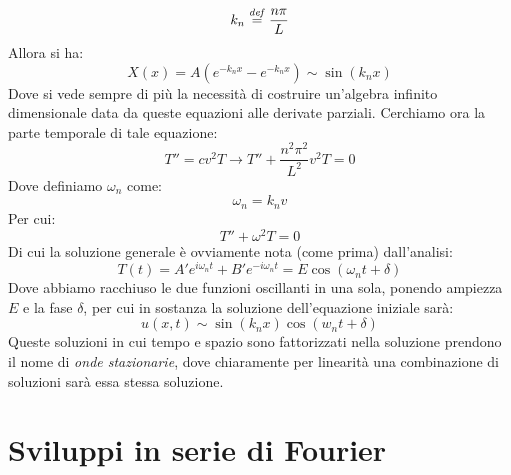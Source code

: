 \begin{equation*}
    k_n \overset{\mathit{def}}{=} \frac{n\pi}{L}
\end{equation*}
Allora si ha:
\begin{equation*}
    X(x) = A ( e^{-k_nx} - e^{-k_nx} ) \sim \sin(k_nx)
\end{equation*}
Dove si vede sempre di più la necessità di costruire un'algebra infinito dimensionale data da queste equazioni alle derivate parziali. Cerchiamo ora la parte temporale di tale equazione:
\begin{equation*}
    T'' = c v^2 T \longrightarrow
    T'' + \frac{n^2\pi^2}{L^2} v^2 T = 0
\end{equation*}
Dove definiamo $\omega_n$ come:
\begin{equation*}
    \omega_n=k_nv
\end{equation*}
Per cui:
\begin{equation*}
    T'' + \omega^2T = 0
\end{equation*}
Di cui la soluzione generale è ovviamente nota (come prima) dall'analisi:
\begin{equation*}
    T(t) = A' e^{i\omega_n t} + B' e^{-i\omega_n t} =
    E \cos(\omega_n t + \delta)
\end{equation*}
Dove abbiamo racchiuso le due funzioni oscillanti in una sola, ponendo ampiezza $E$ e la fase $\delta$, per cui in sostanza la soluzione dell'equazione iniziale sarà:
\begin{equation}
    u(x,t) \sim \sin(k_n x) \cos(w_n t + \delta)
\end{equation}
Queste soluzioni in cui tempo e spazio sono fattorizzati nella soluzione prendono il nome di \textit{onde stazionarie}, dove chiaramente per linearità una combinazione di soluzioni sarà essa stessa soluzione.


\section{Sviluppi in serie di Fourier}

